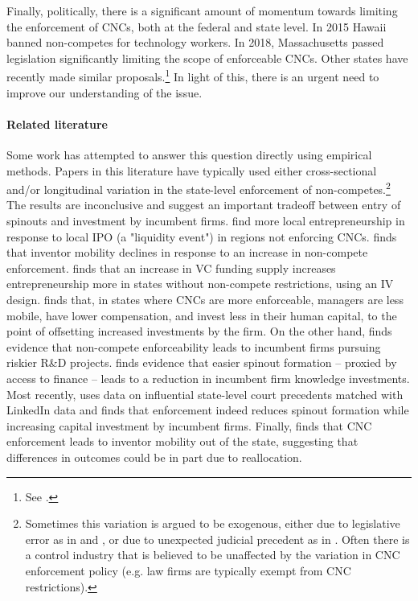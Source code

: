 \documentclass[11pt,english]{article}
\theoremstyle{remark}
\begin{document}
Finally, politically, there is a significant amount of momentum towards limiting the enforcement of CNCs, both at the federal and state level. In 2015 Hawaii banned non-competes for technology workers. In 2018, Massachusetts passed legislation significantly limiting the scope of enforceable CNCs. Other states have recently made similar proposals.\footnote{See \cite{the_white_house_technical_report_non-compete_2016}.} In light of this, there is an urgent need to improve our understanding of the issue. 

\paragraph{Related literature}

Some work has attempted to answer this question directly using empirical methods. Papers in this literature have typically used either cross-sectional and/or longitudinal variation in the state-level enforcement of non-competes.\footnote{Sometimes this variation is argued to be exogenous, either due to legislative error as in \cite{marx_mobility_2009} and \cite{marx_regional_2015}, or due to unexpected judicial precedent as in \cite{jeffers_impact_2018}. Often there is a control industry that is believed to be unaffected by the variation in CNC enforcement policy (e.g. law firms are typically exempt from CNC restrictions).} The results are inconclusive and suggest an important tradeoff between entry of spinouts and investment by incumbent firms. \cite{stuart_liquidity_2003} find more local  entrepreneurship in response to local IPO (a "liquidity event") in regions not enforcing CNCs. \cite{marx_mobility_2009} finds that inventor mobility declines in response to an increase in non-compete enforcement. \cite{samila_venture_2010} finds that an increase in VC funding supply increases entrepreneurship more in states without non-compete restrictions, using an IV design. \cite{garmaise_ties_2011} finds that, in states where CNCs are more enforceable, managers are less mobile, have lower compensation, and invest less in their human capital, to the point of offsetting increased investments by the firm. On the other hand, \cite{conti_non-competition_2014} finds evidence that non-compete enforceability leads to incumbent firms pursuing riskier R\&D projects. \cite{colombo_does_2013} finds evidence that easier spinout formation -- proxied by access to finance -- leads to a reduction in incumbent firm knowledge investments.  Most recently, \cite{jeffers_impact_2018} uses data on influential state-level court precedents matched with LinkedIn data and finds that enforcement indeed reduces spinout formation while increasing capital investment by incumbent firms. Finally, \cite{marx_regional_2015} finds that CNC enforcement leads to inventor mobility out of the state, suggesting that differences in outcomes could be in part due to reallocation. 
\end{document}
